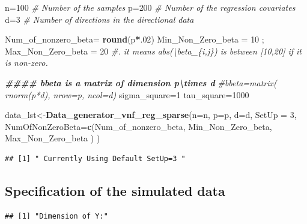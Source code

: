 \documentclass[
]{article}
\newenvironment{Shaded}{\begin{snugshade}}{\end{snugshade}}
\newcommand{\AttributeTok}[1]{\textcolor[rgb]{0.13,0.29,0.53}{#1}}
\newcommand{\CommentTok}[1]{\textcolor[rgb]{0.56,0.35,0.01}{\textit{#1}}}
\newcommand{\DecValTok}[1]{\textcolor[rgb]{0.00,0.00,0.81}{#1}}
\newcommand{\DocumentationTok}[1]{\textcolor[rgb]{0.56,0.35,0.01}{\textbf{\textit{#1}}}}
\newcommand{\FunctionTok}[1]{\textcolor[rgb]{0.13,0.29,0.53}{\textbf{#1}}}
\newcommand{\NormalTok}[1]{#1}
\newcommand{\OtherTok}[1]{\textcolor[rgb]{0.56,0.35,0.01}{#1}}
\newcommand{\SpecialCharTok}[1]{\textcolor[rgb]{0.81,0.36,0.00}{\textbf{#1}}}
\begin{document}
\begin{Shaded}
\begin{Highlighting}[]
\NormalTok{n}\OtherTok{=}\DecValTok{100}  \CommentTok{\# Number of the samples}
\NormalTok{p}\OtherTok{=}\DecValTok{200}    \CommentTok{\# Number of the regression covariates}
\NormalTok{d}\OtherTok{=}\DecValTok{3}  \CommentTok{\# Number of directions in the directional data}

\NormalTok{Num\_of\_nonzero\_beta}\OtherTok{=} \FunctionTok{round}\NormalTok{(p}\SpecialCharTok{*}\NormalTok{.}\DecValTok{02}\NormalTok{)}
\NormalTok{Min\_Non\_Zero\_beta }\OtherTok{=} \DecValTok{10}\NormalTok{ ; Max\_Non\_Zero\_beta }\OtherTok{=} \DecValTok{20} \CommentTok{\#. it means abs(\textbackslash{}beta\_\{i,j\}) is between [10,20] if it is non{-}zero.}

\DocumentationTok{\#\#\#\# bbeta is a matrix of dimension p\textbackslash{}times d}
\CommentTok{\#bbeta=matrix( rnorm(p*d), nrow=p, ncol=d)}
\NormalTok{sigma\_square}\OtherTok{=}\DecValTok{1}
\NormalTok{tau\_square}\OtherTok{=}\DecValTok{1000}

\NormalTok{data\_lst}\OtherTok{\textless{}{-}}\FunctionTok{Data\_generator\_vnf\_reg\_sparse}\NormalTok{(}\AttributeTok{n=}\NormalTok{n,}
                                        \AttributeTok{p=}\NormalTok{p,}
                                        \AttributeTok{d=}\NormalTok{d,}
                                        \AttributeTok{SetUp =} \DecValTok{3}\NormalTok{,}
                                        \AttributeTok{NumOfNonZeroBeta=}\FunctionTok{c}\NormalTok{(Num\_of\_nonzero\_beta,}
\NormalTok{                                                           Min\_Non\_Zero\_beta,}
\NormalTok{                                                           Max\_Non\_Zero\_beta}
\NormalTok{                                        )}
\NormalTok{)}
\end{Highlighting}
\end{Shaded}

\begin{verbatim}
## [1] " Currently Using Default SetUp=3 "
\end{verbatim}

\hypertarget{specification-of-the-simulated-data-1}{%
\subsection{Specification of the simulated
data}\label{specification-of-the-simulated-data-1}}

\begin{verbatim}
## [1] "Dimension of Y:"
\end{verbatim}
\end{document}
